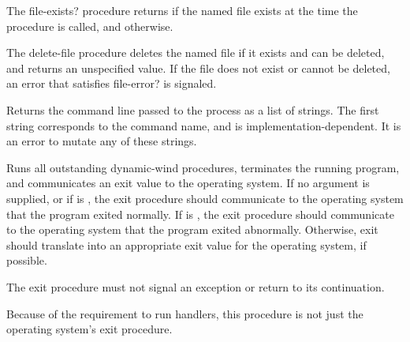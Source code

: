 \begin{entry}{
}

The {\cf file-exists?} procedure returns
\schtrue{} if the named file exists at the time the procedure is called,
and \schfalse{} otherwise.

\end{entry}

\begin{entry}{
}

The {\cf delete-file} procedure deletes the
named file if it exists and can be deleted, and returns an unspecified
value.  If the file does not exist or cannot be deleted, an error
that satisfies {\cf file-error?} is signaled.

\end{entry}

\begin{entry}{
}

Returns the command line passed to the process as a list of
strings.  The first string corresponds to the command name, and is
implementation-dependent.  It is an error to mutate any of these strings.
\end{entry}

\begin{entry}{
}

Runs all outstanding dynamic-wind  procedures, terminates the
running program, and communicates an exit value to the operating system.
If no argument is supplied, or if  is \schtrue{}, the {\cf
exit} procedure should communicate to the operating system that the
program exited normally.  If  is \schfalse{}, the {\cf exit}
procedure should communicate to the operating system that the program
exited abnormally.  Otherwise, {\cf exit} should translate  into
an appropriate exit value for the operating system, if possible.

The {\cf exit} procedure
must not signal an exception or return to its continuation.

\begin{note}
Because of the requirement to run handlers, this procedure is not just the
operating system's exit procedure.
\end{note}

\end{entry}

